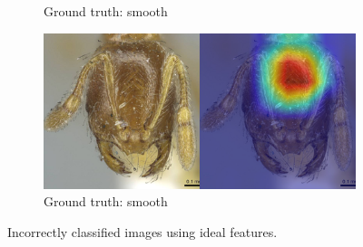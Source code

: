 \documentclass[12pt]{article}
\begin{document}
\begin{figure}
\begin{subfigure}{\subwidth}
        \caption{Ground truth: smooth}
        \label{fig:incorrect_ideal_177}
    \end{subfigure}
    \begin{subfigure}{\subwidth}
        \includegraphics[width=1\linewidth]{assets/gradcam/incorrect_ideal/197.png}
        \caption{Ground truth: smooth}
        \label{fig:incorrect_ideal_197}
    \end{subfigure}
    \caption{Incorrectly classified images using ideal features.}
    \label{fig:incorrect_ideal}
\end{figure}
\end{document}
